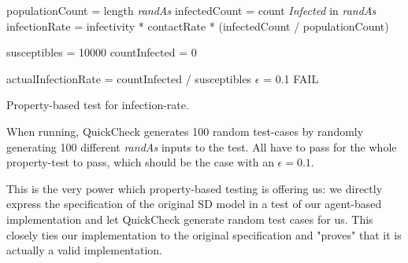 \begin{algorithm}
populationCount     = length \textit{randAs}\;
infectedCount       = count \textit{Infected} in \textit{randAs}\;
infectionRate       = infectivity * contactRate * (infectedCount / populationCount)\;

susceptibles = 10000\;
countInfected = 0\;

actualInfectionRate = countInfected / susceptibles\;
$\epsilon$ = 0.1\;
 {
  FAIL\;
}
\caption{Property-based test for infection-rate.}
\end{algorithm}
\label{alg:prop_test_infectionrate}

When running, QuickCheck generates 100 random test-cases by randomly generating 100 different \textit{randAs} inputs to the test. All have to pass for the whole property-test to pass, which should be the case with an $\epsilon = 0.1$. 

This is the very power which property-based testing is offering us: we directly express the specification of the original SD model in a test of our agent-based implementation and let QuickCheck generate random test cases for us. This closely ties our implementation to the original specification and "proves" that it is actually a valid implementation.

